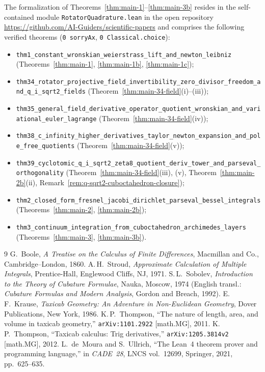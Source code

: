 \documentclass[11pt,a4paper]{article}
\theoremstyle{plain}
\theoremstyle{definition}
\begin{document}
The formalization of Theorems~\ref{thm:main-1}--\ref{thm:main-3b} resides in the self-contained module \texttt{RotatorQuadrature.lean} in the open repository \url{https://github.com/AI-Guiders/scientific-papers} and comprises the following verified theorems (\texttt{0 sorryAx}, \texttt{0 Classical.choice}):
\begin{itemize}[leftmargin=*]
\item \texttt{thm1\_constant\_wronskian\_weierstrass\_lift\_and\_newton\_leibniz} (Theorems~\ref{thm:main-1}, \ref{thm:main-1b}, \ref{thm:main-1c});
\item \texttt{thm34\_rotator\_projective\_field\_invertibility\_zero\_divisor\_freedom\_and\_q\_i\_sqrt2\_fields} (Theorem~\ref{thm:main-34-field}(i)--(iii));
\item \texttt{thm35\_general\_field\_derivative\_operator\_quotient\_wronskian\_and\_variational\_euler\_lagrange} (Theorem~\ref{thm:main-34-field}(iv));
\item \texttt{thm38\_c\_infinity\_higher\_derivatives\_taylor\_newton\_expansion\_and\_pole\_free\_quotients} (Theorem~\ref{thm:main-34-field}(v));
\item \texttt{thm39\_cyclotomic\_q\_i\_sqrt2\_zeta8\_quotient\_deriv\_tower\_and\_parseval\_orthogonality} (Theorem~\ref{thm:main-34-field}(iii), (v), Theorem~\ref{thm:main-2b}(ii), Remark~\ref{rem:q-sqrt2-cuboctahedron-closure});
\item \texttt{thm2\_closed\_form\_fresnel\_jacobi\_dirichlet\_parseval\_bessel\_integrals} (Theorems~\ref{thm:main-2}, \ref{thm:main-2b});
\item \texttt{thm3\_continuum\_integration\_from\_cuboctahedron\_archimedes\_layers} (Theorems~\ref{thm:main-3}, \ref{thm:main-3b}).
\end{itemize}

\begin{thebibliography}{9}
G.~Boole, \emph{A Treatise on the Calculus of Finite Differences}, Macmillan and Co., Cambridge--London, 1860.
A.\,H.~Stroud, \emph{Approximate Calculation of Multiple Integrals}, Prentice-Hall, Englewood Cliffs, NJ, 1971.
S.\,L.~Sobolev, \emph{Introduction to the Theory of Cubature Formulae}, Nauka, Moscow, 1974 (English transl.: \emph{Cubature Formulas and Modern Analysis}, Gordon and Breach, 1992).
E.\,F.~Krause, \emph{Taxicab Geometry: An Adventure in Non-Euclidean Geometry}, Dover Publications, New York, 1986.
K.\,P.~Thompson, ``The nature of length, area, and volume in taxicab geometry,'' \texttt{arXiv:1101.2922} [math.MG], 2011.
K.\,P.~Thompson, ``Taxicab calculus: Trig derivatives,'' \texttt{arXiv:1205.3814v2} [math.MG], 2012.
L.~de~Moura and S.~Ullrich, ``The Lean~4 theorem prover and programming language,'' in \emph{CADE~28}, LNCS vol.~12699, Springer, 2021, pp.~625--635.
\end{thebibliography}
\end{document}
